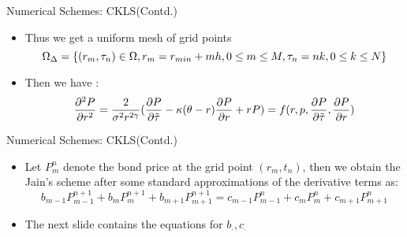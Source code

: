 \documentclass{beamer}
\begin{document}
\begin{frame}{Numerical Schemes: CKLS(Contd.) }
\begin{itemize}
    \item Thus we get a uniform mesh of grid points
\begin{equation*}
    \Omega_{\Delta} = \{(r_{m},\tau_{n}) \in \Omega, r_{m}=r_{min}+mh, 0\le m \le M, \\ 
    \tau_{n}=nk, 0\le k \le N\}
\end{equation*}
 
\item Then we have :
\begin{equation*}
     \frac{\partial^{2} P}{\partial r^{2}} = \frac{2}{\sigma^{2}r^{2\gamma}}(\frac{\partial P}{\partial \Tilde{\tau}}-\kappa(\theta-r)\frac{\partial P}{\partial r}+rP)\\
     =f(r,p,\dfrac{\partial P}{\partial \Tilde{\tau}}, \frac{\partial P}{\partial r})
 \end{equation*}
 
\end{itemize}
 
\end{frame}
 
\begin{frame}{Numerical Schemes: CKLS(Contd.) }
\begin{itemize}
    \item Let $P_{m}^{n}$ denote the bond price at the grid point $(r_{m}, t_{n})$, then we obtain the Jain's scheme after some standard approximations of the derivative terms as:
\begin{equation*}
    b_{m-1}P_{m-1}^{n+1}+b_{m}P_{m}^{n+1}+b_{m+1}P_{m+1}^{n+1} = c_{m-1}P_{m-1}^{n}+c_{m}P_{m}^{n}+c_{m+1}P_{m+1}^{n}
\end{equation*}
\item The next slide contains the equations for $b_{\cdot}, c_{\cdot}$
\end{itemize}
\end{frame}
 
\end{document}
